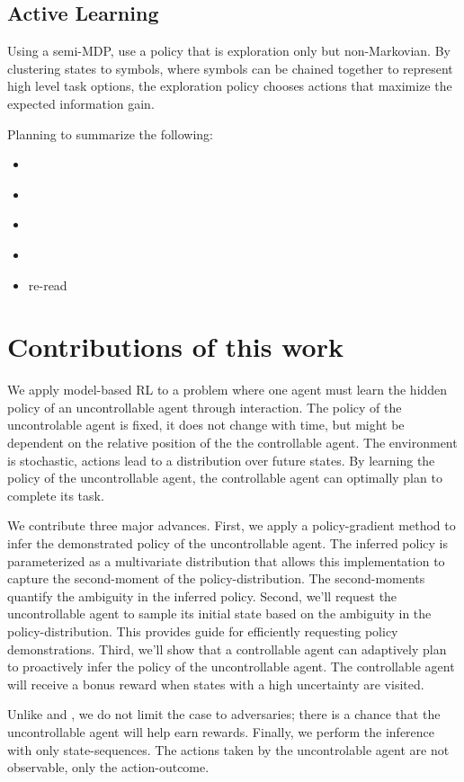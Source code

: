 \subsection{Active Learning}


    Using a semi-MDP,  \cite{andersen2017active} use a policy that is exploration only but non-Markovian.  By clustering
    states to symbols, where symbols can be chained together to represent high level task options, the exploration
    policy chooses actions that maximize the expected information gain.

    Planning to summarize the following:
    \begin{itemize}
        \item \cite{khamassi2017active}
        \item \cite{andersson2017deep}
        \item \cite{martinez2007active}
        \item \cite{akiyama2010efficient}
        \item re-read \cite{andersen2017active}
    \end{itemize}


\section{Contributions of this work}\label{sec:contributions}

    We apply model-based \ac{RL} to a problem where one agent must learn the hidden policy of an uncontrollable agent
    through interaction. The policy of the uncontrolable agent is fixed, it does not change with time, but might be
    dependent on the relative position of the the controllable agent. The environment is stochastic, actions lead to a
    distribution over future states. By learning the policy of the uncontrollable agent, the controllable agent can
    optimally plan to complete its task.

    We contribute three major advances. First, we apply a policy-gradient method to infer the demonstrated policy of the
    uncontrollable agent. The inferred policy is parameterized as a multivariate distribution that allows this
    implementation to capture the second-moment of the policy-distribution. The second-moments quantify the ambiguity in
    the inferred policy. Second,  we'll request the uncontrollable agent to sample its initial state based on the
    ambiguity in the policy-distribution. This provides guide for efficiently requesting policy demonstrations. Third,
    we'll show that a controllable agent can adaptively plan to proactively infer the policy  of the uncontrollable
    agent. The controllable agent will receive a bonus reward when states with a high uncertainty are visited.

    Unlike \cite{lim2013reinforcement} and \cite{bertuccelli2012robust}, we do not limit the case to adversaries; there
    is a chance that the uncontrollable agent will help earn rewards. Finally, we perform the inference with only
    state-sequences. The actions taken by the uncontrolable agent are not observable, only the action-outcome.

